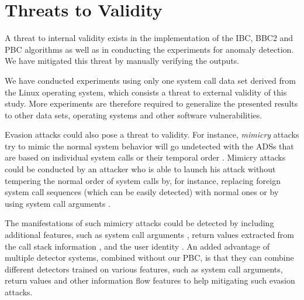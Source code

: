 \section{Threats to Validity}
\label{sec:threat-validity}

A threat to internal validity exists in the implementation of the IBC, BBC2 and PBC algorithms as well as in conducting the experiments for anomaly detection.
We have mitigated this threat by manually verifying the outputs.

We have conducted experiments using only one system call data set derived from the Linux operating system, which consists a threat to external validity of this study.
More experiments are therefore required to generalize the presented results to other data sets, operating systems and other software vulnerabilities.

Evasion attacks could also pose a threat to validity.
For instance, \textit{mimicry} attacks try to mimic the normal system behavior will go undetected with the ADSs that are based on individual system calls or their temporal order \cite{Wagner2002}.
Mimicry attacks could be conducted by an attacker who is able to launch his attack without tempering the normal order of system calls by, for instance, replacing foreign system call sequences (which can be easily detected) with normal ones or by using system call arguments  \cite{Wagner2002}.

The manifestations of such mimicry attacks could be detected by including additional features, such as system call arguments \cite{Bhatkar2006}, return values extracted from the call stack information \cite{Feng2003}, and the user identity \cite{Larson2009}.
An added advantage of multiple detector systems, combined without our PBC, is that they can combine different detectors trained on various features, such as system call arguments, return values and other information flow features to help mitigating such evasion attacks.
